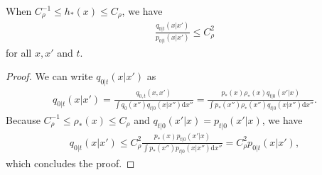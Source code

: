\begin{lem}\label{lem:Bounded-Discrepancy}
    When $C_\rho^{-1}\leq h_*(x)\leq C_\rho$, we have
    \begin{align}
        \frac{q_{0|t}(x|x')}{p_{0|t}(x|x')}\leq C_\rho^2 
    \end{align}
    for all $x,x'$ and $t$.
\end{lem}
\begin{proof}
    We can write $q_{0|t}(x|x')$ as
    \begin{align}
        q_{0|t}(x|x') = \frac{q_{0,t}(x,x')}{\int q_{0}(x'')q_{t|0}(x|x'')\mathrm{d}x''}
        =  \frac{p_*(x)\rho_*(x)q_{t|0}(x'|x)}{\int p_*(x'')\rho_*(x'')q_{t|0}(x|x'')\mathrm{d}x''}.
    \end{align}
    Because $C_\rho^{-1}\leq \rho_*(x)\leq C_\rho$ and $q_{t|0}(x'|x)=p_{t|0}(x'|x)$, we have
    \begin{align}
        q_{0|t}(x|x') \leq  C_\rho^2\frac{p_*(x)p_{t|0}(x'|x)}{\int p_*(x'')p_{t|0}(x|x'')\mathrm{d}x''}
        = C_\rho^2p_{0|t}(x|x'),
    \end{align}
    which concludes the proof.
\end{proof}

